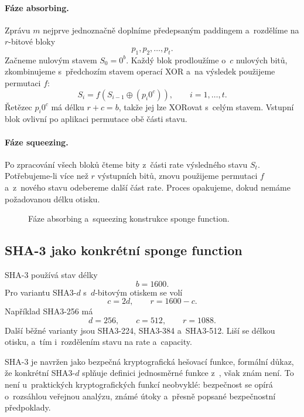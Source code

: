 \paragraph{Fáze absorbing.}

Zprávu $m$ nejprve jednoznačně doplníme předepsaným paddingem a~rozdělíme na $r$-bitové bloky
\[
    p_1,p_2,\ldots,p_t.
\]
Začneme nulovým stavem $S_0=0^b$. Každý blok prodloužíme o~$c$ nulových bitů, zkombinujeme s~předchozím stavem operací XOR a~na výsledek použijeme permutaci $f$:
\[
    S_i
    =
    f\left(S_{i-1}\oplus(p_i0^c)\right),
    \qquad i=1,\ldots,t.
\]
Řetězec $p_i0^c$ má délku $r+c=b$, takže jej lze XORovat s~celým stavem. Vstupní blok ovlivní po aplikaci permutace obě části stavu.

\paragraph{Fáze squeezing.}

Po zpracování všech bloků čteme bity z~části rate výsledného stavu $S_t$. Potřebujeme-li více než $r$ výstupních bitů, znovu použijeme permutaci $f$ a~z~nového stavu odebereme další část rate. Proces opakujeme, dokud nemáme požadovanou délku otisku.

\begin{figure}[ht]
    \centering
    
    \caption{Fáze absorbing a~squeezing konstrukce sponge function.}
    \label{fig:krypto-sponge}
\end{figure}


\subsection{SHA-3 jako konkrétní sponge function}

SHA-3 používá stav délky
\[
    b=1600.
\]
Pro variantu SHA3-$d$ s~$d$-bitovým otiskem se volí
\[
    c=2d,
    \qquad
    r=1600-c.
\]
Například SHA3-256 má
\[
    d=256,
    \qquad
    c=512,
    \qquad
    r=1088.
\]
Další běžné varianty jsou SHA3-224, SHA3-384 a~SHA3-512. Liší se délkou otisku, a~tím i~rozdělením stavu na rate a~capacity.

SHA-3 je navržen jako bezpečná kryptografická hešovací funkce, formální důkaz, že konkrétní SHA3-$d$ splňuje definici jednosměrné funkce z~, však znám není. To není u~praktických kryptografických funkcí neobvyklé: bezpečnost se opírá o~rozsáhlou veřejnou analýzu, známé útoky a~přesně popsané bezpečnostní předpoklady.

